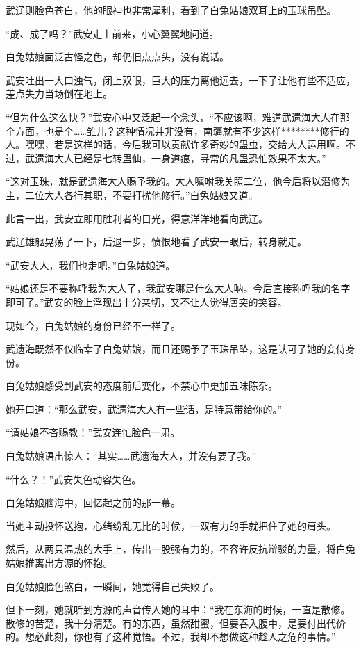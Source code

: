 \begin{this_body}
武辽则脸色苍白，他的眼神也非常犀利，看到了白兔姑娘双耳上的玉球吊坠。

“成、成了吗？”武安走上前来，小心翼翼地问道。

白兔姑娘面泛古怪之色，却仍旧点点头，没有说话。

武安吐出一大口浊气，闭上双眼，巨大的压力离他远去，一下子让他有些不适应，差点失力当场倒在地上。

“但为什么这么快？”武安心中又泛起一个念头，“不应该啊，难道武遗海大人在那个方面，也是个……雏儿？这种情况并非没有，南疆就有不少这样********修行的人。嘿嘿，若是这样的话，今后我可以贡献许多奇妙的蛊虫，交给大人运用啊。不过，武遗海大人已经是七转蛊仙，一身道痕，寻常的凡蛊恐怕效果不太大。”

“这对玉珠，就是武遗海大人赐予我的。大人嘱咐我关照二位，他今后将以潜修为主，二位大人各行其职，不要打扰他修行。”白兔姑娘又道。

此言一出，武安立即用胜利者的目光，得意洋洋地看向武辽。

武辽雄躯晃荡了一下，后退一步，愤恨地看了武安一眼后，转身就走。

“武安大人，我们也走吧。”白兔姑娘道。

“姑娘还是不要称呼我为大人了，我武安哪是什么大人呐。今后直接称呼我的名字即可了。”武安的脸上浮现出十分亲切，又不让人觉得唐突的笑容。

现如今，白兔姑娘的身份已经不一样了。

武遗海既然不仅临幸了白兔姑娘，而且还赐予了玉珠吊坠，这是认可了她的妾侍身份。

白兔姑娘感受到武安的态度前后变化，不禁心中更加五味陈杂。

她开口道：“那么武安，武遗海大人有一些话，是特意带给你的。”

“请姑娘不吝赐教！”武安连忙脸色一肃。

白兔姑娘语出惊人：“其实……武遗海大人，并没有要了我。”

“什么？！”武安失色动容失色。

白兔姑娘脑海中，回忆起之前的那一幕。

当她主动投怀送抱，心绪纷乱无比的时候，一双有力的手就把住了她的肩头。

然后，从两只温热的大手上，传出一股强有力的，不容许反抗辩驳的力量，将白兔姑娘推离出方源的怀抱。

白兔姑娘脸色煞白，一瞬间，她觉得自己失败了。

但下一刻，她就听到方源的声音传入她的耳中：“我在东海的时候，一直是散修。散修的苦楚，我十分清楚。有的东西，虽然甜蜜，但要吞入腹中，是要付出代价的。想必此刻，你也有了这种觉悟。不过，我却不想做这种趁人之危的事情。”


\end{this_body}

